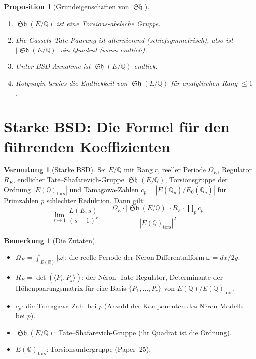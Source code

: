 \documentclass[12pt,a4paper]{amsart}
\newtheorem{proposition}[theorem]{Proposition}
\theoremstyle{definition}
\newtheorem{remark}[theorem]{Bemerkung}
\newtheorem{conjecture}[theorem]{Vermutung}
\newcommand{\Q}{\mathbb{Q}}
\newcommand{\R}{\mathbb{R}}
\DeclareMathOperator{\Sha}{\mathfrak{Sh}}
\begin{document}
\begin{proposition}[Grundeigenschaften von $\Sha$]
\label{prop:sha_basic}
\begin{enumerate}
  \item[\textup{(i)}] $\Sha(E/\Q)$ ist eine Torsions-abelsche Gruppe.
  \item[\textup{(ii)}] Die Cassels--Tate-Paarung ist alternierend
    (schiefsymmetrisch), also ist $|\Sha(E/\Q)|$ ein Quadrat (wenn endlich).
  \item[\textup{(iii)}] Unter BSD-Annahme ist $\Sha(E/\Q)$ endlich.
  \item[\textup{(iv)}] Kolyvagin bewies die Endlichkeit von $\Sha(E/\Q)$
    f\"ur analytischen Rang $\le 1$.
\end{enumerate}
\end{proposition}

\section{Starke BSD: Die Formel f\"ur den f\"uhrenden Koeffizienten}

\begin{conjecture}[Starke BSD]
\label{conj:strong_bsd}
Sei $E/\Q$ mit Rang $r$, reeller Periode $\Omega_E$, Regulator $R_E$,
endlicher Tate--Shafarevich-Gruppe $\Sha(E/\Q)$, Torsionsgruppe der
Ordnung $|E(\Q)_{\mathrm{tors}}|$ und Tamagawa-Zahlen
$c_p = |E(\Q_p)/E_0(\Q_p)|$ f\"ur Primzahlen $p$ schlechter Reduktion.
Dann gilt:
\begin{equation}
  \label{eq:strong_bsd}
  \lim_{s \to 1} \frac{L(E,s)}{(s-1)^r}
  \;=\;
  \frac{\Omega_E \cdot |\Sha(E/\Q)| \cdot R_E \cdot \prod_p c_p}
       {|E(\Q)_{\mathrm{tors}}|^2}.
\end{equation}
\end{conjecture}

\begin{remark}[Die Zutaten]
\begin{itemize}
  \item $\Omega_E = \int_{E(\R)} |\omega|$: die reelle Periode der
    N\'eron-Differentialform $\omega = dx/2y$.
  \item $R_E = \det(\langle P_i, P_j\rangle)$: der N\'eron--Tate-Regulator,
    Determinante der H\"ohenpaarungsmatrix
    f\"ur eine Basis $\{P_1,\ldots,P_r\}$ von $E(\Q)/E(\Q)_{\mathrm{tors}}$.
  \item $c_p$: die Tamagawa-Zahl bei $p$ (Anzahl der Komponenten des
    N\'eron-Modells bei $p$).
  \item $\Sha(E/\Q)$: Tate--Shafarevich-Gruppe (ihr Quadrat ist die Ordnung).
  \item $E(\Q)_{\mathrm{tors}}$: Torsionsuntergruppe (Paper~25).
\end{itemize}
\end{remark}
\end{document}
